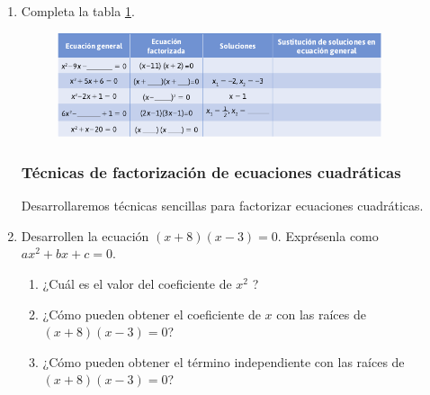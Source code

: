 \documentclass[11pt]{book}
\begin{document}
\begin{enumerate}
    \item Completa la tabla \ref{tab:table2.6}.

          \begin{figure}[H]
              \centering
              \includegraphics[width=0.9\textwidth]{table2.6.png}
              \label{tab:table2.6}
          \end{figure}

          \subsubsection{Técnicas de factorización de ecuaciones cuadráticas}
          Desarrollaremos técnicas sencillas para factorizar ecuaciones cuadráticas.

    \item Desarrollen la ecuación $(x + 8)(x - 3) = 0$. Exprésenla como $ax^2 + bx + c = 0$.
          \begin{enumerate}
              \item ¿Cuál es el valor del coeficiente de $x^2$ ?
              \item ¿Cómo pueden obtener el coeficiente de $x$ con las raíces de $(x + 8)(x - 3) = 0$?
              \item ¿Cómo pueden obtener el término independiente con las raíces de $(x + 8)(x - 3) = 0$?
          \end{enumerate}


\end{enumerate}
\end{document}
